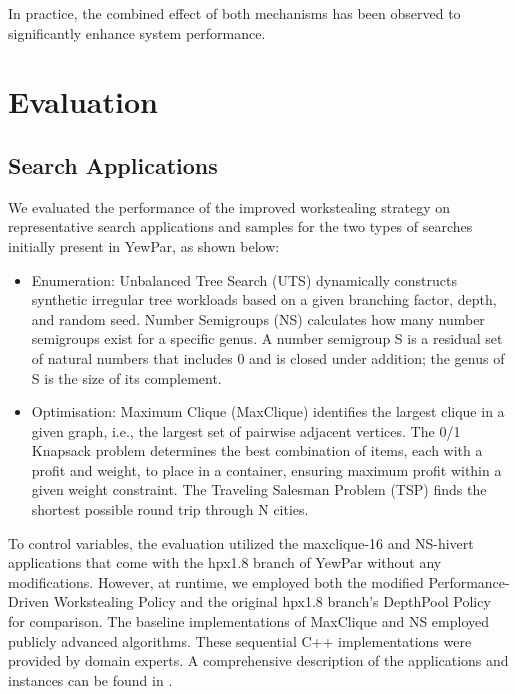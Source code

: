 \documentclass{mproj}
\begin{document}
In practice, the combined effect of both mechanisms has been observed to significantly enhance system performance.



\chapter{Evaluation}

\section{Search Applications}

We evaluated the performance of the improved workstealing strategy on representative search applications and samples for the two types of searches initially present in YewPar, as shown below:

\begin{itemize}
    \item Enumeration:
          Unbalanced Tree Search (UTS) dynamically constructs synthetic irregular tree workloads based on a given branching factor, depth, and random seed\cite{olivier2006uts}.
          Number Semigroups (NS) calculates how many number semigroups exist for a specific genus\cite{fromentin2016exploring}.
          A number semigroup S is a residual set of natural numbers that includes 0 and is closed under addition;
          the genus of S is the size of its complement.
    \item Optimisation:
          Maximum Clique (MaxClique) identifies the largest clique in a given graph, i.e., the largest set of pairwise adjacent vertices.
          The 0/1 Knapsack problem determines the best combination of items, each with a profit and weight, to place in a container,
          ensuring maximum profit within a given weight constraint.
          The Traveling Salesman Problem (TSP) finds the shortest possible round trip through N cities.
\end{itemize}

To control variables, the evaluation utilized the maxclique-16 and NS-hivert applications that come with the hpx1.8 branch of YewPar without any modifications.
However, at runtime, we employed both the modified Performance-Driven Workstealing Policy and the original hpx1.8 branch's DepthPool Policy for comparison.
The baseline implementations of MaxClique\cite{mccreesh2013multithreading} and NS\cite{fromentin2016exploring} employed publicly advanced algorithms.
These sequential C++ implementations were provided by domain experts.
A comprehensive description of the applications and instances can be found in \cite{archibald2018}.
\end{document}
